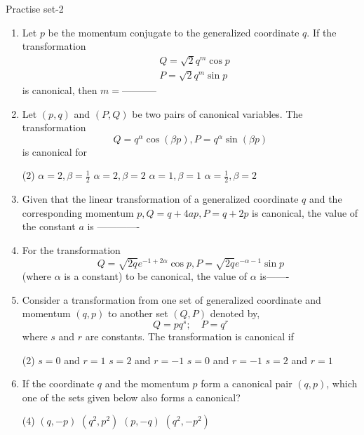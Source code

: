 \newpage
\begin{abox}
	Practise set-2
\end{abox}
\begin{enumerate}
	\item  Let $p$ be the momentum conjugate to the generalized coordinate $q$. If the transformation
	$$
	\begin{aligned}
	&Q=\sqrt{2} q^{m} \cos p \\
	&P=\sqrt{2} q^{m} \sin p
	\end{aligned}
	$$
	is canonical, then $m=$-----------
{}
	\item  Let $(p, q)$ and $(P, Q)$ be two pairs of canonical variables. The transformation
	$$
	Q=q^{\alpha} \cos (\beta p), P=q^{\alpha} \sin (\beta p)
	$$
	is canonical for
{}
	 \begin{tasks}(2)
		\task[\textbf{a.}]$\alpha=2, \beta=\frac{1}{2}$
		\task[\textbf{b.}]$\alpha=2, \beta=2$
		\task[\textbf{c.}]$\alpha=1, \beta=1$
		\task[\textbf{d.}] $\alpha=\frac{1}{2}, \beta=2$
	\end{tasks}
	\item  Given that the linear transformation of a generalized coordinate $q$ and the corresponding momentum $p, Q=q+4 a p, P=q+2 p$ is canonical, the value of the constant $a$ is -------------
	{}
\item  For the transformation
$$
Q=\sqrt{2 q} e^{-1+2 \alpha} \cos p, P=\sqrt{2 q} e^{-\alpha-1} \sin p
$$
(where $\alpha$ is a constant) to be canonical, the value of $\alpha$ is-------
{}
	\item  Consider a transformation from one set of generalized coordinate and momentum $(q, p)$ to another set $(Q, P)$ denoted by,
	$$
	Q=p q^{s} ; \quad P=q^{r}
	$$
	where $s$ and $r$ are constants. The transformation is canonical if
{}
	 \begin{tasks}(2)
		\task[\textbf{a.}]$s=0$ and $r=1$
		\task[\textbf{b.}]$s=2$ and $r=-1$
		\task[\textbf{c.}] $s=0$ and $r=-1$
		\task[\textbf{d.}] $s=2$ and $r=1$
	\end{tasks}
	\item  If the coordinate $q$ and the momentum $p$ form a canonical pair $(q, p)$, which one of the sets given below also forms a canonical?
{}
	 \begin{tasks}(4)
		\task[\textbf{a.}]$(q,-p)$
		\task[\textbf{b.}]$\left(q^{2}, p^{2}\right)$
		\task[\textbf{c.}]$(p,-q)$
		\task[\textbf{d.}] $\left(q^{2},-p^{2}\right)$

\end{tasks}
\end{enumerate}
